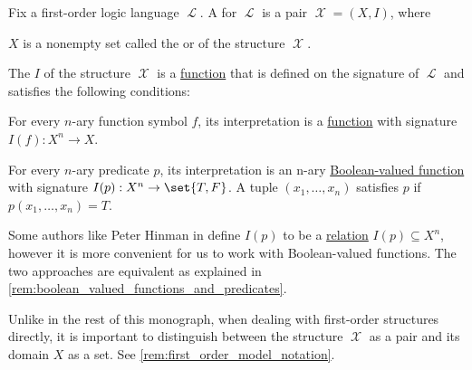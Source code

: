 \begin{definition}\label{def:first_order_structure}
  Fix a first-order logic language \( \mscrL \). A  for \( \mscrL \) is a pair \( \mscrX = (X, I) \), where
  \begin{thmenum}
     \( X \) is a nonempty set called the  or  of the structure \( \mscrX \).

     The  \( I \) of the structure \( \mscrX \) is a \hyperref[def:function]{function} that is defined on the signature of \( \mscrL \) and satisfies the following conditions:
    \begin{thmenum}
       For every \( n \)-ary function symbol \( f \), its interpretation is a \hyperref[def:function]{function} with signature \( I(f): X^n \to X \).

       For every \( n \)-ary predicate \( p \), its interpretation is an n-ary \hyperref[def:boolean_function]{Boolean-valued function} with signature \( I(p): X^n \to \set{ T, F } \). A tuple \( (x_1, \ldots, x_n) \) satisfies \( p \) if \( p(x_1, \ldots, x_n) = T \).
    \end{thmenum}
  \end{thmenum}
\end{definition}
\begin{comments}
  \item Some authors like Peter Hinman in  define \( I(p) \) to be a \hyperref[def:relation]{relation} \( I(p) \subseteq X^n \), however it is more convenient for us to work with Boolean-valued functions. The two approaches are equivalent as explained in \cref{rem:boolean_valued_functions_and_predicates}.
  \item Unlike in the rest of this monograph, when dealing with first-order structures directly, it is important to distinguish between the structure \( \mscrX \) as a pair and its domain \( X \) as a set. See \cref{rem:first_order_model_notation}.
\end{comments}

